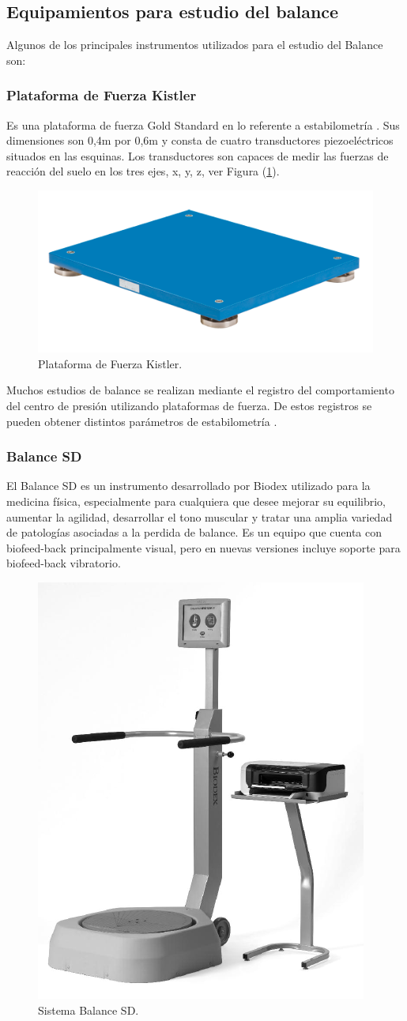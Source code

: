 \documentclass[12pt,a4paper]{article}
\begin{document}
\subsection{Equipamientos para estudio del balance} Algunos de los principales instrumentos utilizados para el estudio del Balance son:

\subsubsection{Plataforma de Fuerza Kistler} Es una plataforma de fuerza Gold Standard en lo referente a estabilometría \cite{donath_testing_2012}. Sus dimensiones son 0,4m por 0,6m y consta de cuatro transductores piezoeléctricos situados en las esquinas. Los transductores son capaces de medir las fuerzas de reacción del suelo en los tres ejes, x, y, z, ver Figura (\ref{fig:KistlerFP}).

\begin{figure}[H]
	\centering
	\includegraphics[width=0.5\linewidth]{images/KistlerFP}
	\caption{Plataforma de Fuerza Kistler.}
	\label{fig:KistlerFP}
\end{figure}

Muchos estudios de balance se realizan mediante el registro del comportamiento del centro de presión utilizando plataformas de fuerza. De estos registros se pueden obtener distintos parámetros de estabilometría \cite{scoppa_clinical_2013}.

\subsubsection{Balance SD} El Balance SD es un instrumento desarrollado por Biodex \cite{Biodex} utilizado para la medicina física, especialmente para cualquiera que desee mejorar su equilibrio, aumentar la agilidad, desarrollar el tono muscular y tratar una amplia variedad de patologías asociadas a la perdida de balance.
Es un equipo que cuenta con biofeed-back principalmente visual, pero en nuevas versiones incluye soporte para biofeed-back vibratorio.

\begin{figure}[H]
	\centering
	\includegraphics[width=0.25\linewidth]{images/BalanceSD}
	\caption{Sistema Balance SD.}
	\label{fig:balanceSD}
\end{figure}
\end{document}
